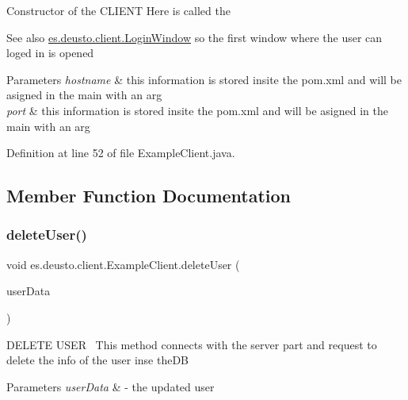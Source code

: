Constructor of the C\+L\+I\+E\+NT Here is called the \begin{DoxySeeAlso}{See also}
\hyperlink{classes_1_1deusto_1_1client_1_1_login_window}{es.\+deusto.\+client.\+Login\+Window} so the first window where the user can loged in is opened 
\end{DoxySeeAlso}

\begin{DoxyParams}{Parameters}
{\em hostname} & this information is stored insite the pom.\+xml and will be asigned in the main with an arg \\
\hline
{\em port} & this information is stored insite the pom.\+xml and will be asigned in the main with an arg \\
\hline
\end{DoxyParams}


Definition at line 52 of file Example\+Client.\+java.



\subsection{Member Function Documentation}
\mbox{\label{classes_1_1deusto_1_1client_1_1_example_client_a20bd33a8b93e804925b4a8e338413b00}} 
\subsubsection{\texorpdfstring{delete\+User()}{deleteUser()}}
{\footnotesize\ttfamily void es.\+deusto.\+client.\+Example\+Client.\+delete\+User (\begin{DoxyParamCaption}\item[{\hyperlink{classes_1_1deusto_1_1serialization_1_1_user_data}{User\+Data}}]{user\+Data }\end{DoxyParamCaption})}

D\+E\+L\+E\+TE U\+S\+ER~\newline
This method connects with the server part and request to delete the info of the user inse the\+DB 
\begin{DoxyParams}{Parameters}
{\em user\+Data} & -\/ the updated user \\
\hline
\end{DoxyParams}


